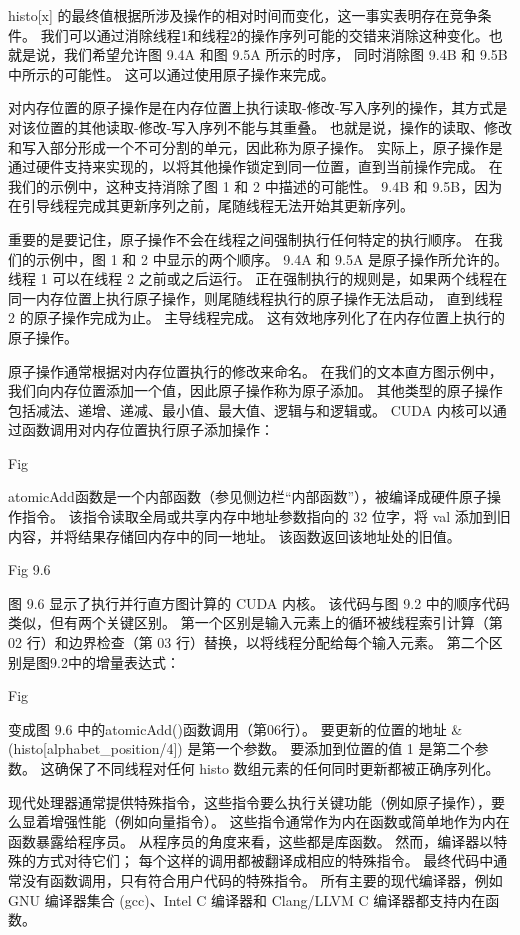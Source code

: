 histo[x] 的最终值根据所涉及操作的相对时间而变化，这一事实表明存在竞争条件。 
我们可以通过消除线程1和线程2的操作序列可能的交错来消除这种变化。也就是说，我们希望允许图 9.4A 和图 9.5A 所示的时序， 
同时消除图 9.4B 和 9.5B 中所示的可能性。 这可以通过使用原子操作来完成。

对内存位置的原子操作是在内存位置上执行读取-修改-写入序列的操作，其方式是对该位置的其他读取-修改-写入序列不能与其重叠。 
也就是说，操作的读取、修改和写入部分形成一个不可分割的单元，因此称为原子操作。 
实际上，原子操作是通过硬件支持来实现的，以将其他操作锁定到同一位置，直到当前操作完成。 
在我们的示例中，这种支持消除了图 1 和 2 中描述的可能性。 
9.4B 和 9.5B，因为在引导线程完成其更新序列之前，尾随线程无法开始其更新序列。

重要的是要记住，原子操作不会在线程之间强制执行任何特定的执行顺序。 在我们的示例中，图 1 和 2 中显示的两个顺序。 
9.4A 和 9.5A 是原子操作所允许的。 线程 1 可以在线程 2 之前或之后运行。
正在强制执行的规则是，如果两个线程在同一内存位置上执行原子操作，则尾随线程执行的原子操作无法启动，
直到线程 2 的原子操作完成为止。 主导线程完成。 这有效地序列化了在内存位置上执行的原子操作。

原子操作通常根据对内存位置执行的修改来命名。 在我们的文本直方图示例中，我们向内存位置添加一个值，因此原子操作称为原子添加。 
其他类型的原子操作包括减法、递增、递减、最小值、最大值、逻辑与和逻辑或。 
CUDA 内核可以通过函数调用对内存位置执行原子添加操作：

{\color{red} Fig}

atomicAdd函数是一个内部函数（参见侧边栏“内部函数”），被编译成硬件原子操作指令。 
该指令读取全局或共享内存中地址参数指向的 32 位字，将 val 添加到旧内容，并将结果存储回内存中的同一地址。 
该函数返回该地址处的旧值。

{\color{red} Fig 9.6}

图 9.6 显示了执行并行直方图计算的 CUDA 内核。 该代码与图 9.2 中的顺序代码类似，但有两个关键区别。 
第一个区别是输入元素上的循环被线程索引计算（第 02 行）和边界检查（第 03 行）替换，以将线程分配给每个输入元素。 
第二个区别是图9.2中的增量表达式：

{\color{red} Fig}

变成图 9.6 中的atomicAdd()函数调用（第06行）。 要更新的位置的地址 \&(histo[alphabet\_position/4]) 是第一个参数。
要添加到位置的值 1 是第二个参数。 这确保了不同线程对任何 histo 数组元素的任何同时更新都被正确序列化。

\begin{remark}[内部函数]
现代处理器通常提供特殊指令，这些指令要么执行关键功能（例如原子操作），要么显着增强性能（例如向量指令）。 
这些指令通常作为内在函数或简单地作为内在函数暴露给程序员。 从程序员的角度来看，这些都是库函数。 
然而，编译器以特殊的方式对待它们； 每个这样的调用都被翻译成相应的特殊指令。 
最终代码中通常没有函数调用，只有符合用户代码的特殊指令。 
所有主要的现代编译器，例如 GNU 编译器集合 (gcc)、Intel C 编译器和 Clang/LLVM C 编译器都支持内在函数。
\end{remark}

